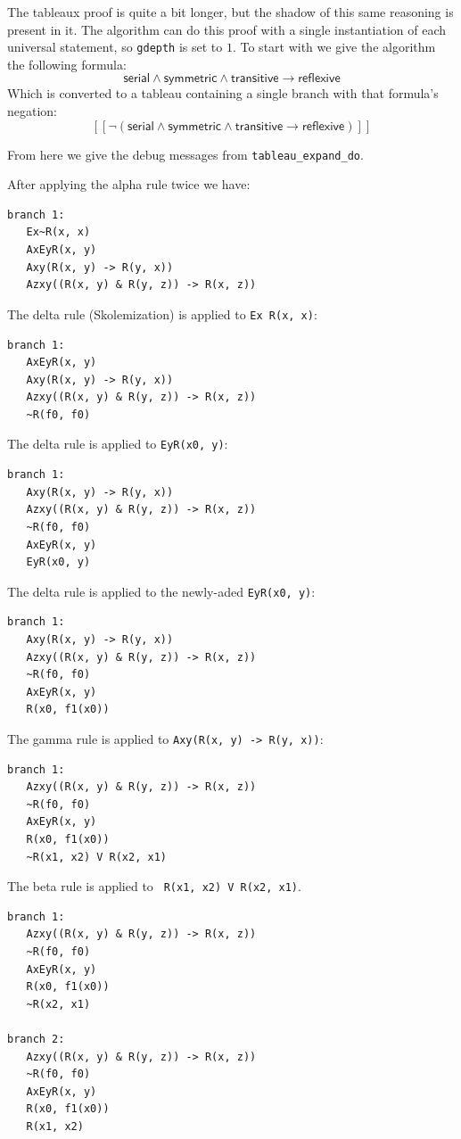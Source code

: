 \documentclass[a4paper,notitlepage]{scrartcl}
\begin{document}
The tableaux proof is quite a bit longer, but the shadow of this same 
   reasoning is present in it.
The algorithm can do this proof with a single instantiation of each 
   universal statement, so \texttt{gdepth} is set to $1$.
To start with we give the algorithm the following formula:
\[
\textsf{serial}\land\textsf{symmetric}\land\textsf{transitive}
   \rightarrow\textsf{reflexive}
\]
Which is converted to a tableau containing a single branch with that 
   formula's negation:
\[
[[\lnot(\textsf{serial}\land\textsf{symmetric}\land\textsf{transitive}
   \rightarrow\textsf{reflexive})]]
\]

From here we give the debug messages from \texttt{tableau\_expand\_do}.

After applying the alpha rule twice we have:
\begin{verbatim}
branch 1:
   Ex~R(x, x)
   AxEyR(x, y)
   Axy(R(x, y) -> R(y, x))
   Azxy((R(x, y) & R(y, z)) -> R(x, z))
\end{verbatim}

The   delta rule (Skolemization) is applied to \texttt{Ex~R(x, x)}:
\begin{verbatim}
branch 1:
   AxEyR(x, y)
   Axy(R(x, y) -> R(y, x))
   Azxy((R(x, y) & R(y, z)) -> R(x, z))
   ~R(f0, f0)
\end{verbatim}

The delta rule is applied to \texttt{EyR(x0, y)}:
\begin{verbatim}
branch 1:
   Axy(R(x, y) -> R(y, x))
   Azxy((R(x, y) & R(y, z)) -> R(x, z))
   ~R(f0, f0)
   AxEyR(x, y)
   EyR(x0, y)
\end{verbatim}

The delta rule is applied to the newly-aded \texttt{EyR(x0, y)}:

\begin{verbatim}
branch 1:
   Axy(R(x, y) -> R(y, x))
   Azxy((R(x, y) & R(y, z)) -> R(x, z))
   ~R(f0, f0)
   AxEyR(x, y)
   R(x0, f1(x0))
\end{verbatim}

The gamma rule is applied to \texttt{Axy(R(x, y) -> R(y, x))}:
\begin{verbatim}
branch 1:
   Azxy((R(x, y) & R(y, z)) -> R(x, z))
   ~R(f0, f0)
   AxEyR(x, y)
   R(x0, f1(x0))
   ~R(x1, x2) V R(x2, x1)
\end{verbatim}

The beta rule is applied to \texttt{~R(x1, x2) V R(x2, x1)}.

\begin{verbatim}
branch 1:
   Azxy((R(x, y) & R(y, z)) -> R(x, z))
   ~R(f0, f0)
   AxEyR(x, y)
   R(x0, f1(x0))
   ~R(x2, x1)

branch 2:
   Azxy((R(x, y) & R(y, z)) -> R(x, z))
   ~R(f0, f0)
   AxEyR(x, y)
   R(x0, f1(x0))
   R(x1, x2)
\end{verbatim}
\end{document}
